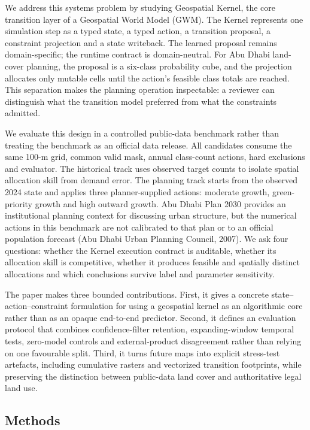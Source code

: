 We address this systems problem by studying Geospatial Kernel, the core
transition layer of a Geospatial World Model (GWM). The Kernel
represents one simulation step as a typed state, a typed action, a
transition proposal, a constraint projection and a state writeback. The
learned proposal remains domain-specific; the runtime contract is
domain-neutral. For Abu Dhabi land-cover planning, the proposal is a
six-class probability cube, and the projection allocates only mutable
cells until the action's feasible class totals are reached. This
separation makes the planning operation inspectable: a reviewer can
distinguish what the transition model preferred from what the
constraints admitted.

We evaluate this design in a controlled public-data benchmark rather
than treating the benchmark as an official data release. All candidates
consume the same 100-m grid, common valid mask, annual class-count
actions, hard exclusions and evaluator. The historical track uses
observed target counts to isolate spatial allocation skill from demand
error. The planning track starts from the observed 2024 state and
applies three planner-supplied actions: moderate growth, green-priority
growth and high outward growth. Abu Dhabi Plan 2030 provides an
institutional planning context for discussing urban structure, but the
numerical actions in this benchmark are not calibrated to that plan or
to an official population forecast (Abu Dhabi Urban Planning Council,
2007). We ask four questions: whether the Kernel execution contract is
auditable, whether its allocation skill is competitive, whether it
produces feasible and spatially distinct allocations and which
conclusions survive label and parameter sensitivity.

The paper makes three bounded contributions. First, it gives a concrete
state--action--constraint formulation for using a geospatial kernel as
an algorithmic core rather than as an opaque end-to-end predictor.
Second, it defines an evaluation protocol that combines
confidence-filter retention, expanding-window temporal tests, zero-model
controls and external-product disagreement rather than relying on one
favourable split. Third, it turns future maps into explicit stress-test
artefacts, including cumulative rasters and vectorized transition
footprints, while preserving the distinction between public-data land
cover and authoritative legal land use.

\subsection{Methods}\label{methods}

